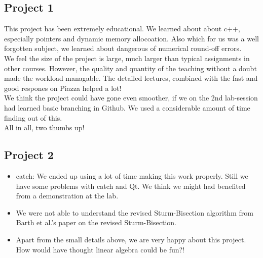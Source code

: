 \documentclass{article}
\begin{document}
\subsection{Project 1}
This project has been extremely educational. We learned about about c++, especially pointers and dynamic memory allocoation. Also which for us was a well forgotten subject, we learned about dangerous of numerical round-off errors. \\

We feel the size of the project is large, much larger than typical assignments in other courses. However, the quality and quantity of the teaching without a doubt made the workload managable. The detailed lectures, combined with the fast and good respones on Piazza helped a lot!\\

We think the project could have gone even smoother, if we on the 2nd lab-session had learned basic branching in Github. We used a considerable amount of time finding out of this.\\

All in all, two thumbs up!

\subsection{Project 2}
\begin{itemize}
	\item  catch: We ended up using a lot of time making this work properly. Still we have some problems with catch and Qt. We think we might had benefited from a demonstration at the lab.
	
	\item We were not able to understand the revised Sturm-Bisection algorithm from Barth et al.'s \cite{barth} paper on the revised Sturm-Bisection. 
	
	\item Apart from the small details above, we are very happy about this project. How would have thought linear algebra could be fun?!
\end{itemize}
\end{document}
